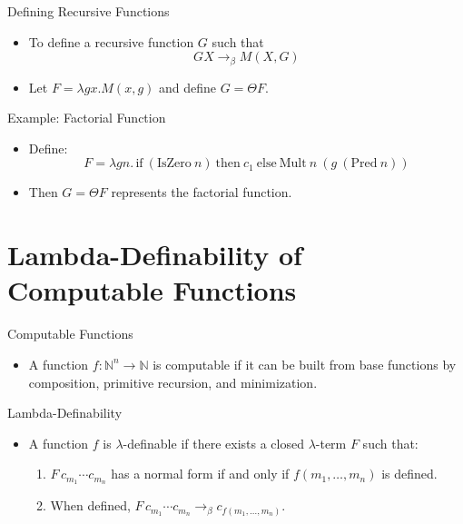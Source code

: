 \documentclass{beamer}
\begin{document}
\begin{frame}{Defining Recursive Functions}
  \begin{itemize}
    \item To define a recursive function \(G\) such that
      \[
      G X \rightarrow_\beta M(X, G)
      \]
    \item Let \(F = \lambda g x. M(x, g)\) and define \(G = \Theta F\).
  \end{itemize}
\end{frame}

\begin{frame}{Example: Factorial Function}
  \begin{itemize}
    \item Define:
      \[
      F = \lambda g n.\, \text{if}\ (\text{IsZero}\ n)\ \text{then}\ c_1\ \text{else}\ \text{Mult}\ n\ (g\ (\text{Pred}\ n))
      \]
    \item Then \(G = \Theta F\) represents the factorial function.
  \end{itemize}
\end{frame}

\section{Lambda-Definability of Computable Functions}
\begin{frame}{Computable Functions}
  \begin{itemize}
    \item A function \(f : \mathbb{N}^n \rightarrow \mathbb{N}\) is computable if it can be built from base functions by composition, primitive recursion, and minimization.
  \end{itemize}
\end{frame}

\begin{frame}{Lambda-Definability}
  \begin{itemize}
    \item A function \(f\) is \(\lambda\)-definable if there exists a closed \(\lambda\)-term \(F\) such that:
      \begin{enumerate}
        \item \(F\,c_{m_1}\cdots c_{m_n}\) has a normal form if and only if \(f(m_1,\dots,m_n)\) is defined.
        \item When defined, \(F\,c_{m_1}\cdots c_{m_n} \rightarrow_\beta c_{f(m_1,\dots,m_n)}\).
      \end{enumerate}
  \end{itemize}
\end{frame}
\end{document}
